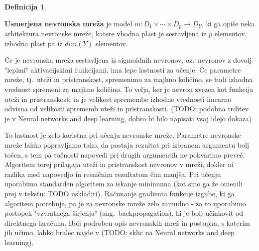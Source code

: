\documentclass[12pt,a4paper,twoside]{article}
\theoremstyle{definition} %
\newtheorem{definicija}{Definicija}[section]
\theoremstyle{plain} %
\numberwithin{equation}{section}  %
\begin{document}
\begin{definicija}
\begin{enumerate}


\end{enumerate}

\textbf{Usmerjena nevronska mreža} je model $m: D_1 \times \cdots \times D_p \rightarrow D_Y$, ki ga opiše neka arhitektura nevronske mreže, 
katere vhodna plast je sestavljena iz $p$ elementov, izhodna plast pa iz $dim(Y)$ elementov.
\end{definicija}

Če je nevronska mreža sestavljena iz sigmoidnih nevronov, oz.~nevronov z dovolj "lepimi" aktivacijskimi funkcijami, ima lepe lastnosti za učenje. 
Če parametre mreže, tj.~uteži in pristranskost, spremenimo za majhno količino, se tudi izhodna vrednost spremeni za majhno količino. 
To velja, ker je nevron zvezen kot funkcija uteži in pristranskosti in je velikost spremembe izhodne vrednosti linearno odvisna od velikosti sprememb uteži in pristranskosti. 
(TODO: podobna trditev je v Neural networks and deep learning, dobro bi bilo napisati vsaj idejo dokaza)

To lastnost je zelo koristna pri učenju nevronske mreže. 
Parametre nevronske mreže lahko popravljamo tako, da postaja rezultat pri izbranem argumentu bolj točen, s tem pa točnosti napovedi pri drugih argumentih ne pokvarimo preveč. 
Algoritem torej prilagaja uteži in pristranskost nevronov v mreži, dokler ni razlika med napovedjo in resničnim rezultatom čim manjša. 
Pri učenju uporabimo standarden algoritem za iskanje minimuma (kot smo ga že omenili prej v tekstu: TODO uskladiti). 
Računanje gradienta funkcije izgube, ki ga algoritem potrebuje, pa je za nevronske mreže zelo zamudno - za to uporabimo postopek "vzvratnega širjenja" (ang.~backpropagation), ki je bolj učinkovit od direktnega izračuna. %
Bolj podroben opis nevronskih mrež in postopka, s katerim jih učimo, lahko bralec najde v (TODO: sklic na Neural networks and deep learning).
\end{document}
